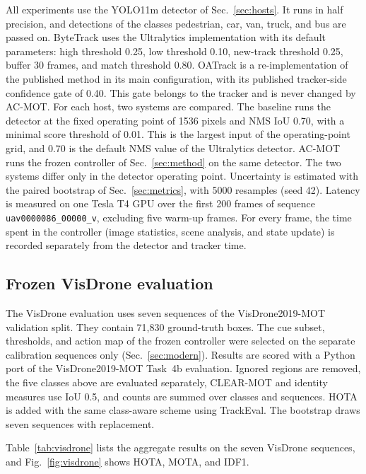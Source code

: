 \documentclass[journal]{new-aiaa}
\begin{document}
All experiments use the YOLO11m detector of Sec.~\ref{sec:hosts}. It runs in
half precision, and detections of the classes pedestrian, car, van, truck, and
bus are passed on. ByteTrack uses the Ultralytics implementation with its
default parameters: high threshold 0.25, low threshold 0.10, new-track
threshold 0.25, buffer 30 frames, and match threshold 0.80. OATrack is a
re-implementation of the published method \cite{qi2026oatrack} in its main
configuration, with its published tracker-side confidence gate of 0.40. This
gate belongs to the tracker and is never changed by AC-MOT. For each host, two
systems are compared. The baseline runs the detector at the fixed operating
point of 1536 pixels and NMS IoU 0.70, with a minimal score threshold of 0.01.
This is the largest input of the operating-point grid, and 0.70 is the default
NMS value of the Ultralytics detector. AC-MOT runs the frozen controller of
Sec.~\ref{sec:method} on the same detector. The two systems differ only in
the detector operating point. Uncertainty is estimated with the paired
bootstrap of Sec.~\ref{sec:metrics}, with 5000 resamples (seed 42).
Latency is measured on one Tesla T4 GPU over the first 200 frames of sequence
\texttt{uav0000086\_00000\_v}, excluding five warm-up frames. For every
frame, the time spent in the controller (image statistics, scene analysis, and
state update) is recorded separately from the detector and tracker time.

\subsection{Frozen VisDrone evaluation}
The VisDrone evaluation uses seven sequences of the VisDrone2019-MOT
validation split. They contain 71,830 ground-truth boxes. The cue subset,
thresholds, and action map of the frozen controller were selected on the
separate calibration sequences only (Sec.~\ref{sec:modern}). Results are
scored with a Python port of the VisDrone2019-MOT Task~4b evaluation. Ignored
regions are removed, the five classes above are evaluated separately,
CLEAR-MOT and identity measures use IoU 0.5, and counts are summed over
classes and sequences. HOTA is added with the same class-aware scheme using
TrackEval. The bootstrap draws seven sequences with replacement.

Table~\ref{tab:visdrone} lists the aggregate results on the seven VisDrone
sequences, and Fig.~\ref{fig:visdrone} shows HOTA, MOTA, and IDF1.
\end{document}
